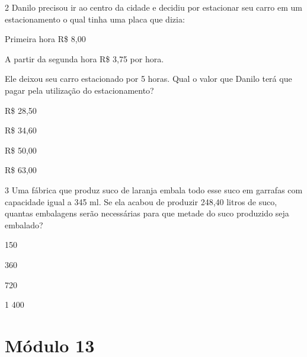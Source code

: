 {


\num{2} Danilo precisou ir ao centro da cidade e decidiu por estacionar seu
carro em um estacionamento o qual tinha uma placa que dizia:

Primeira hora R\$ 8,00

A partir da segunda hora R\$ 3,75 por hora.


Ele deixou seu carro estacionado por 5 horas. Qual o valor que Danilo
terá que pagar pela utilização do estacionamento?

\begin{escolha}
\item
  R\$ 28,50
\item
  R\$ 34,60
\item
  R\$ 50,00
\item
  R\$ 63,00
\end{escolha}



\num{3} Uma fábrica que produz suco de laranja embala todo esse suco em
garrafas com capacidade igual a 345 ml. Se ela acabou de produzir 248,40
litros de suco, quantas embalagens serão necessárias para que metade do
suco produzido seja embalado?

\begin{escolha}
\item
  150
\item
  360
\item
  720
\item
  1 400
\end{escolha}



\chapter{Módulo 13}


}
